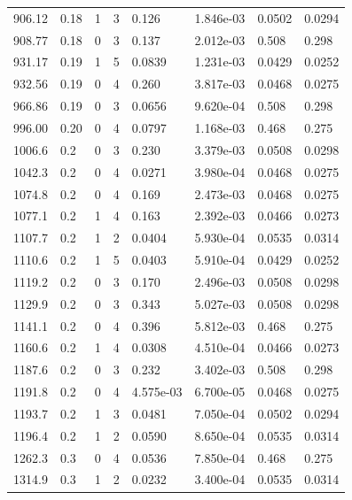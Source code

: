 \documentclass[preview]{standalone}
\begin{document}
{{{\begin{tabular}{L{1.2cm}C{1.2cm} C{0.3cm}C{0.5cm} C{1.4cm}C{1.4cm} C{1.4cm}C{1.4cm}}
  906.12  &  0.18  & 1     &  3 &  0.126  & 1.846e-03  & 0.0502 &  0.0294   \\ 
  908.77  &  0.18  & 0     &  3 &  0.137  & 2.012e-03  & 0.508 &  0.298   \\ 
  931.17  &  0.19  & 1     &  5 &  0.0839  & 1.231e-03  & 0.0429 &  0.0252   \\ 
  932.56  &  0.19  & 0     &  4 &  0.260  & 3.817e-03  & 0.0468 &  0.0275   \\ 
  966.86  &  0.19  & 0     &  3 &  0.0656  & 9.620e-04  & 0.508 &  0.298   \\ 
  996.00  &  0.20  & 0     &  4 &  0.0797  & 1.168e-03  & 0.468 &  0.275   \\ 
  1006.6  &   0.2  & 0     &  3 &  0.230  & 3.379e-03  & 0.0508 &  0.0298   \\ 
  1042.3  &   0.2  & 0     &  4 &  0.0271  & 3.980e-04  & 0.0468 &  0.0275   \\ 
  1074.8  &   0.2  & 0     &  4 &  0.169  & 2.473e-03  & 0.0468 &  0.0275   \\ 
  1077.1  &   0.2  & 1     &  4 &  0.163  & 2.392e-03  & 0.0466 &  0.0273   \\ 
  1107.7  &   0.2  & 1     &  2 &  0.0404  & 5.930e-04  & 0.0535 &  0.0314   \\ 
  1110.6  &   0.2  & 1     &  5 &  0.0403  & 5.910e-04  & 0.0429 &  0.0252   \\ 
  1119.2  &   0.2  & 0     &  3 &  0.170  & 2.496e-03  & 0.0508 &  0.0298   \\ 
  1129.9  &   0.2  & 0     &  3 &  0.343  & 5.027e-03  & 0.0508 &  0.0298   \\ 
  1141.1  &   0.2  & 0     &  4 &  0.396  & 5.812e-03  & 0.468 &  0.275   \\ 
  1160.6  &   0.2  & 1     &  4 &  0.0308  & 4.510e-04  & 0.0466 &  0.0273   \\ 
  1187.6  &   0.2  & 0     &  3 &  0.232  & 3.402e-03  & 0.508 &  0.298   \\ 
  1191.8  &   0.2  & 0     &  4 &  4.575e-03  & 6.700e-05  & 0.0468 &  0.0275   \\ 
  1193.7  &   0.2  & 1     &  3 &  0.0481  & 7.050e-04  & 0.0502 &  0.0294   \\ 
  1196.4  &   0.2  & 1     &  2 &  0.0590  & 8.650e-04  & 0.0535 &  0.0314   \\ 
  1262.3  &   0.3  & 0     &  4 &  0.0536  & 7.850e-04  & 0.468 &  0.275   \\ 
  1314.9  &   0.3  & 1     &  2 &  0.0232  & 3.400e-04  & 0.0535 &  0.0314   \\ 

\end{tabular}}}}
\end{document}
